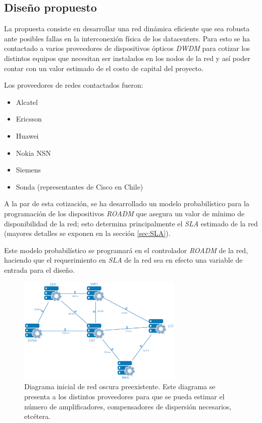 \subsection{Diseño propuesto}
\label{sec:diseno}

La propuesta consiste en desarrollar una red dinámica eficiente que
sea robusta ante posibles fallas en la interconexión física de los
datacenters. Para esto se ha contactado a varios proveedores de
dispositivos ópticos \emph{DWDM} para cotizar los distintos equipos
que necesitan ser instalados en los nodos de la red y así poder contar
con un valor estimado de el costo de capital del proyecto.

Los proveedores de redes contactados fueron:
\begin{itemize}
\item Alcatel
\item Ericsson
\item Huawei
\item Nokia NSN
\item Siemens
\item Sonda (representantes de Cisco en Chile)
\end{itemize}

A la par de esta cotización, se ha desarrollado un modelo
probabilístico para la programación de los dispositivos \emph{ROADM}
que asegura un valor de mínimo de disponibilidad de la red; esto
determina principalmente el \emph{SLA} estimado de la red (mayores
detalles se exponen en la sección \ref{sec:SLA}).

Este modelo probabilístico se programará en el controlador
\emph{ROADM} de la red, haciendo que el requerimiento en \emph{SLA} de
la red sea en efecto una variable de entrada para el diseño.

\begin{figure}[h]
\centering
\includegraphics[width=0.7\textwidth]{Imagenes/Diagrama_Fibra_Oscura.eps}
\caption{Diagrama inicial de red oscura preexistente. Este diagrama se
  presenta a los distintos proveedores para que se pueda estimar el
  número de amplificadores, compensadores de dispersión necesarios,
  etcétera.}
\end{figure}


